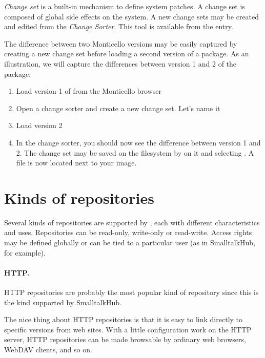 \documentclass[a4paper,10pt,twoside]{book}
\begin{document}
\emph{Change set} is a \pharo built-in mechanism to define system patches. A change set is composed of global side effects on the system. A new change sets may be created and edited from the \emph{Change Sorter}. This tool is available from the  entry.

The difference between two Monticello versions may be easily captured by creating a new change set before loading a second version of a package. As an illustration, we will capture the differences between version 1 and 2 of the  package:
\begin{enumerate}
\item Load version 1 of  from the Monticello browser
\item Open a change sorter and create a new change set. Let's name it 
\item Load version 2
\item In the change sorter, you should now see the difference between version 1 and 2. The change set may be saved on the filesystem by  on it and selecting . A  file is now located next to your \pharo image.
\end{enumerate}


\section{Kinds of repositories}

Several kinds of repositories are supported by \Mont, each with different characteristics and uses. Repositories can be read-only, write-only or read-write. Access rights may be defined globally or can be tied to a particular user (as in SmalltalkHub, for example).

\paragraph{HTTP.} HTTP repositories are probably the most popular kind of repository since this is the kind supported by SmalltalkHub. %

The nice thing about HTTP repositories is that it is easy to link directly to specific versions from web sites. With a little configuration work on the HTTP server, HTTP repositories can be made browsable by ordinary web browsers, WebDAV clients, and so on.
\end{document}
